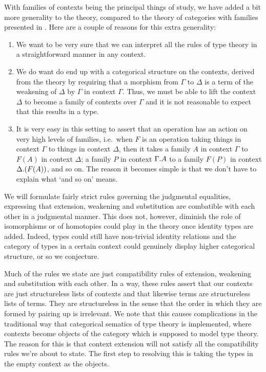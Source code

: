 With families of contexts being the principal things of
study, we have added a bit more generality to the theory, compared to the
theory of categories with families presented in \cite{Dybjer1996}. Here are
a couple of reasons for this extra generality:
\begin{enumerate}
\item We want to be very sure that we can interpret all the rules of type theory
in a straightforward manner in any context.
\item We do want do end up with a categorical structure on the contexts, derived
from the theory by requiring that a morphism from $\Gamma$ to $\Delta$ is a
term of the weakening of $\Delta$ by $\Gamma$ in context $\Gamma$. Thus, we
must be able to lift the context $\Delta$ to become a family of contexts over
$\Gamma$ and it is not reasonable to expect that this results in a type.
\item It is very easy in this setting to assert that an operation has an action
on very high levels of families, i.e.~when $F$ is an operation taking things in
context $\Gamma$ to things in context $\Delta$, then it takes a family $A$ in
context $\Gamma$ to $F(A)$ in context $\Delta$; a family $P$ in context
$\ctxext{\Gamma}{A}$ to a family $F(P)$ in context $\ctxext{\Delta}{(F(A))}$,
and so on. The reason it becomes simple is that we don't have to explain what
`and so on' means.
\end{enumerate}

We will formulate fairly strict rules governing the judgmental equalities,
expressing that extension, weakening and substitution are combatible with
each other in a judgmental manner. This does not, however, diminish the role
of isomorphisms or of homotopies could play in the theory once identity types
are added. Indeed, types could still have non-trivial identity relations and
the category of types in a certain context could genuinely display higher
categorical structure, or so we conjecture.

Much of the rules we state are just compatibility rules of extension, weakening
and substitution with each other. In a way, these rules assert that our contexts
are just structureless lists of contexts and that likewise terms are structureless
lists of terms. They are structureless in the sense that the order in which
they are formed by pairing up is irrelevant. We note that this causes complications
in the traditional way that categorical sematics of type theory is implemented,
where contexts become objects of the category which is supposed to model type
theory. The reason for this is that context extension will not satisfy all the
compatibility rules we're about to state. The first step to resolving this is taking
the types in the empty context as the objects. 

